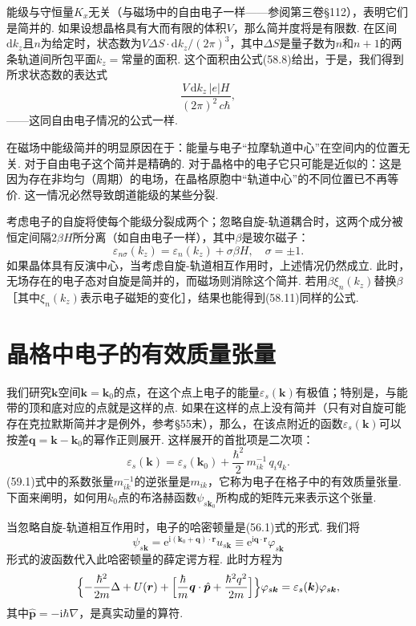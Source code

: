 能级与守恒量$K_x$无关（与磁场中的自由电子一样——参阅第三卷§112），表明它们是简并的. 如果设想晶格具有大而有限的体积$V$，那么简并度将是有限数. 在区间$\mathrm dk_z$且$n$为给定时，状态数为$V\Delta S\cdot\mathrm dk_z/(2\pi)^3$，其中$\Delta S$是量子数为$n$和$n+1$的两条轨道间所包平面$k_z=$常量的面积. 这个面积由公式(58.8)给出，于是，我们得到所求状态数的表达式
\begin{equation}
\frac{V\,\mathrm dk_z\,|e|H}{(2\pi)^2\,c\hbar},
\label{58.10}
\end{equation}
——这同自由电子情况的公式一样.

在磁场中能级简并的明显原因在于：能量与电子“拉摩轨道中心”在空间内的位置无关. 对于自由电子这个简并是精确的. 对于晶格中的电子它只可能是近似的：这是因为存在非均匀（周期）的电场，在晶格原胞中“轨道中心”的不同位置已不再等价. 这一情况必然导致朗道能级的某些分裂.

考虑电子的自旋将使每个能级分裂成两个；忽略自旋-轨道耦合时，这两个成分被恒定间隔$2\beta H$所分离（如自由电子一样），其中$\beta$是玻尔磁子：
\begin{equation}
\varepsilon_{n\sigma}(k_z)=\varepsilon_n(k_z)+\sigma\beta H,\quad\sigma=\pm1.
\label{58.11}
\end{equation}
如果晶体具有反演中心，当考虑自旋-轨道相互作用时，上述情况仍然成立. 此时，无场存在的电子态对自旋是简并的，而磁场则消除这个简并. 若用$\beta\xi_n(k_z)$替换$\beta$［其中$\xi_n(k_z)$表示电子磁矩的变化］，结果也能得到(58.11)同样的公式.

\section{晶格中电子的有效质量张量}

我们研究$\bm k$空间$\bm k=\bm k_0$的点，在这个点上电子的能量$\varepsilon_s(\bm k)$有极值；特别是，与能带的顶和底对应的点就是这样的点. 如果在这样的点上没有简并（只有对自旋可能存在克拉默斯简并才是例外，参考§55末），那么，在该点附近的函数$\varepsilon_s(\bm k)$可以按差$\bm q=\bm k-\bm k_0$的幂作正则展开. 这样展开的首批项是二次项：
\begin{equation}
\varepsilon_s(\bm k)=\varepsilon_s(\bm k_0)+\frac{\hbar^2}{2}\,m^{-1}_{ik}\,q_iq_k.
\label{59.1}
\end{equation}
(59.1)式中的系数张量$m^{-1}_{ik}$的逆张量是$m_{ik}$，它称为电子在格子中的有效质量张量. 下面来阐明，如何用$k_0$点的布洛赫函数$\psi_{s\bm k_0}$所构成的矩阵元来表示这个张量.

当忽略自旋-轨道相互作用时，电子的哈密顿量是(56.1)式的形式. 我们将
\begin{equation}
\psi_{s\bm k}=\mathrm e^{\mathrm i(\bm k_0+\bm q)\cdot\bm r}u_{s\bm k}\equiv
\mathrm e^{\mathrm i\bm q\cdot\bm r}\varphi_{s\bm k}
\label{59.2}
\end{equation}
形式的波函数代入此哈密顿量的薛定谔方程. 此时方程为
\begin{equation}
\Bigl\{-\frac{\hbar^2}{2m}\Delta+U(\bm r)
+\Bigl[\frac{\hbar}{m}\bm q\cdot\hat{\bm p}+\frac{\hbar^2q^2}{2m}\Bigr]\Bigr\}\varphi_{s\bm k}
=\varepsilon_s(\bm k)\varphi_{s\bm k},
\label{59.3}
\end{equation}
其中$\hat{\bm p}=-\mathrm i\hbar\nabla$，是真实动量的算符.

